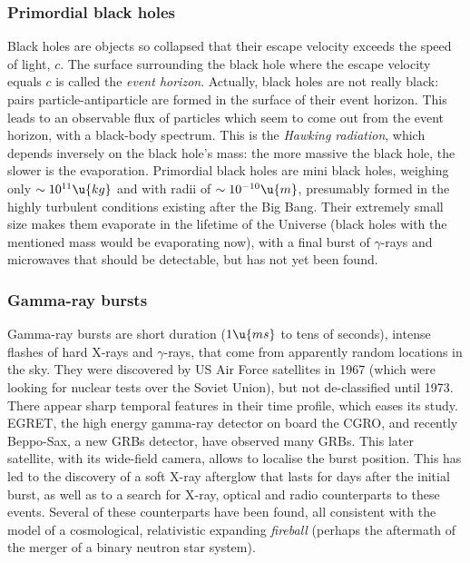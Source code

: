 \subsubsection{Primordial black holes}
\label{sec:primbh}

Black holes are objects so collapsed that their escape velocity exceeds
the speed of light, $c$. The surface surrounding the black hole where
the escape velocity equals $c$ is called the \emph{event horizon}.
Actually, black holes are not really black: pairs particle-antiparticle
are formed in the surface of their event horizon. This leads to an
observable flux of particles which seem to come out from the event
horizon, with a black-body spectrum. This is the \emph{Hawking
radiation}, which depends inversely on the black hole's mass: the more
massive the black hole, the slower is the evaporation.  Primordial black
holes are mini black holes, weighing only $\sim 10^{11}\u{kg}$ and with
radii of $\sim 10^{-10}\u{m}$, presumably formed in the highly turbulent
conditions existing after the Big Bang. Their extremely small size makes
them evaporate in the lifetime of the Universe (black holes with the
mentioned mass would be evaporating now), with a final burst of
$\gamma$-rays and microwaves that should be detectable, but has not yet
been found. 

\crspectrumfig

\subsubsection{Gamma-ray bursts}
\label{sec:grbs}

Gamma-ray bursts are short duration ($1\u{ms}$ to tens of seconds),
intense flashes of hard X-rays and $\gamma$-rays, that come from
apparently random locations in the sky.  They were discovered by US Air
Force satellites in 1967 (which were looking for nuclear tests over the
Soviet Union), but not de-classified until 1973. There appear sharp
temporal features in their time profile, which eases its study. EGRET,
the high energy gamma-ray detector on board the CGRO, and recently
Beppo-Sax, a new GRBs detector, have observed many GRBs. This later
satellite, with its wide-field camera, allows to localise the burst
position. This has led to the discovery of a soft X-ray afterglow that
lasts for days after the initial burst, as well as to a search for
X-ray, optical and radio counterparts to these events. Several of these
counterparts have been found, all consistent with the model of a
cosmological, relativistic expanding \emph{fireball} (perhaps the
aftermath of the merger of a binary neutron star system). 

